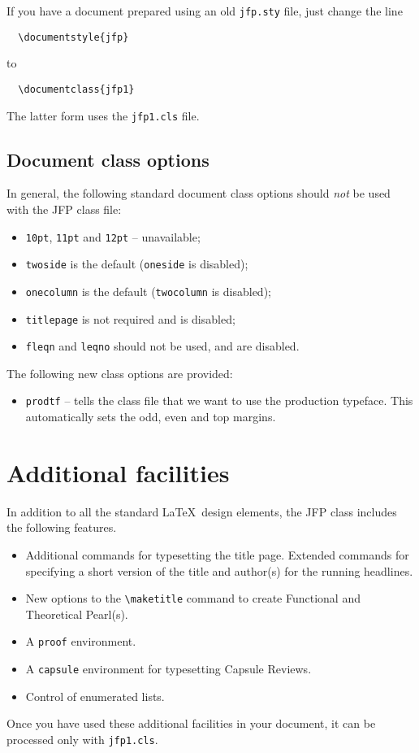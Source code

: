 \documentclass{jfp1}
\begin{document}
If you have a document prepared using an old \verb"jfp.sty" file,
just change the line
\begin{verbatim}
  \documentstyle{jfp}
\end{verbatim}
to
\begin{verbatim}
  \documentclass{jfp1}
\end{verbatim}
The latter form uses the \verb"jfp1.cls" file.

\subsection{Document class options}\label{sec:ClassOp}

In general, the following standard document class options should \emph{not} be
used with the JFP class file:
%
\begin{itemize}
  \item \texttt{10pt}, \texttt{11pt} and \texttt{12pt} -- unavailable;
  \item \texttt{twoside} is the default (\texttt{oneside} is disabled);
  \item \texttt{onecolumn} is the default (\texttt{twocolumn} is disabled);
  \item \texttt{titlepage} is not required and is disabled;
  \item \texttt{fleqn} and \texttt{leqno} should not be used, and are disabled.
\end{itemize}
%
\ifprodtf
The following new class options are provided:
\begin{itemize}
  \item \texttt{prodtf} -- tells the class file that we want to use the
    production typeface. This automatically sets the odd, even and top
    margins.
\end{itemize}
\fi

\section{Additional facilities}

In addition to all the standard \LaTeX\ design elements, the JFP class
includes the following features.
%
\begin{itemize}
  \item Additional commands for typesetting the title page. Extended
        commands for specifying a short version of the title and author(s)
        for the running headlines.
  \item New options to the \verb"\maketitle" command to create Functional and
        Theoretical Pearl(s).
  \item A \verb"proof" environment.
  \item A \verb"capsule" environment for typesetting Capsule Reviews.
  \item Control of enumerated lists.
\end{itemize}
%
Once you have used these additional facilities in your document,
it can be processed only with \verb"jfp1.cls".
\end{document}
